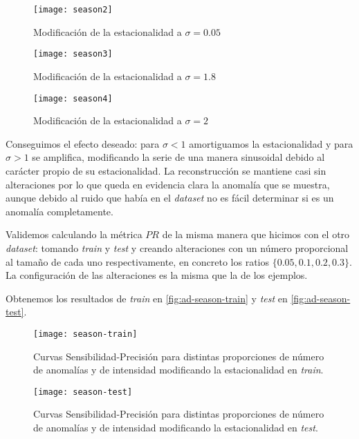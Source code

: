 \begin{figure}[htpb]
  \centering
  \texttt{[image: season2]}
  \caption{Modificación de la estacionalidad a $\sigma = 0.05$}
  \label{fig:ad-season2}
\end{figure}

\begin{figure}[htpb]
  \centering
  \texttt{[image: season3]}
  \caption{Modificación de la estacionalidad a $\sigma = 1.8$}
  \label{fig:ad-season3}
\end{figure}

\begin{figure}[htpb]
  \centering
  \texttt{[image: season4]}
  \caption{Modificación de la estacionalidad a $\sigma = 2$}
  \label{fig:ad-season4}
\end{figure}

Conseguimos el efecto deseado: para $\sigma < 1$ amortiguamos la estacionalidad y para $\sigma > 1$ se amplifica, modificando la serie de una manera sinusoidal debido al carácter propio de su estacionalidad. La reconstrucción se mantiene casi sin alteraciones por lo que queda en evidencia clara la anomalía que se muestra, aunque debido al ruido que había en el \emph{dataset} no es fácil determinar si es un anomalía completamente.

Validemos calculando la métrica $PR$ de la misma manera que hicimos con el otro \emph{dataset}: tomando \emph{train} y \emph{test} y creando alteraciones con un número proporcional al tamaño de cada uno respectivamente, en concreto los ratios $\{0.05, 0.1, 0.2, 0.3\}$. La configuración de las alteraciones es la misma que la de los ejemplos.

Obtenemos los resultados de \emph{train} en \autoref{fig:ad-season-train} y \emph{test} en \autoref{fig:ad-season-test}.

\begin{figure}[htpb]
  \centering
  \texttt{[image: season-train]}
  \caption{Curvas Sensibilidad-Precisión para distintas proporciones de número de anomalías y de intensidad modificando la estacionalidad en \emph{train}.}
  \label{fig:ad-season-train}
\end{figure}

\begin{figure}[htpb]
  \centering
  \texttt{[image: season-test]}
  \caption{Curvas Sensibilidad-Precisión para distintas proporciones de número de anomalías y de intensidad modificando la estacionalidad en \emph{test}.}
  \label{fig:ad-season-test}
\end{figure}

